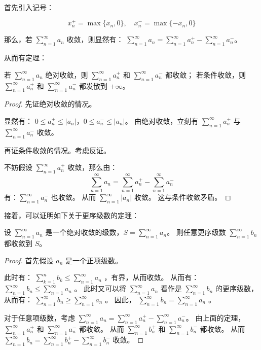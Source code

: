 首先引入记号：

\begin{equation*}
  x_n^+ = \max\{x_n, 0\},\quad x_n^- = \max\{-x_n, 0\}
\end{equation*}

那么，若 $\sum_{n=1}^{\infty} a_n$ 收敛，则显然有： $\sum_{n=1}^{\infty} a_n = \sum_{n=1}^{\infty} a_n^+ - \sum_{n=1}^{\infty} a_n^-$。

从而有定理：

\begin{theorem}
  若 $\sum_{n=1}^{\infty} a_n$ 绝对收敛，则 $\sum_{n=1}^{\infty} a_n^+$ 和 $\sum_{n=1}^{\infty} a_n^-$ 都收敛；
  若条件收敛，则 $\sum_{n=1}^{\infty} a_n^+$ 和 $\sum_{n=1}^{\infty} a_n^-$ 都发散到 $+\infty$。
\end{theorem}

\begin{proof}
  先证绝对收敛的情况。

  显然有： $0 \leq a_n^+ \leq |a_n|$，$0 \leq a_n^- \leq |a_n|$。
  由绝对收敛，立刻有 $\sum_{n=1}^{\infty} a_n^+$ 与 $\sum_{n=1}^{\infty} a_n^-$ 收敛。

  再证条件收敛的情况。考虑反证。

  不妨假设 $\sum_{n=1}^{\infty} a_n^+$ 收敛，那么由：
  $$\sum_{n=1}^{\infty} a_n = \sum_{n=1}^{\infty} a_n^+ - \sum_{n=1}^{\infty} a_n^-$$
  有：$\sum_{n=1}^{\infty} a_n^-$ 也收敛。
  从而 $\sum_{n=1}^{\infty} |a_n|$ 收敛。
  这与条件收敛矛盾。
\end{proof}

接着，可以证明如下关于更序级数的定理：

\begin{theorem}\label{thm:rearrangement-theorem}
  设 $\sum_{n=1}^{\infty} a_n$ 是一个绝对收敛的级数，$S = \sum_{n=1}^{\infty} a_n$。
  则任意更序级数 $\sum_{n=1}^{\infty} b_n$ 都收敛到 $S$。
\end{theorem}

\begin{proof}
  首先假设 $a_n$ 是一个正项级数。

  此时有： $\sum_{k=1}^{n} b_k \leq \sum_{n=1}^{\infty} a_n$ ，有界，从而收敛。
  从而有： $\sum_{n=1}^{\infty} b_n \leq \sum_{n=1}^{\infty} a_n$ 。
  此时又可以将 $\sum_{n=1}^{\infty} a_n$ 看作是 $\sum_{n=1}^{\infty} b_n$ 的更序级数，
  从而有： $\sum_{n=1}^{\infty} b_n \geq \sum_{n=1}^{\infty} a_n$ 。
  因此， $\sum_{n=1}^{\infty} b_n = \sum_{n=1}^{\infty} a_n$ 。

  对于任意项级数，考虑 $\sum_{n=1}^{\infty} a_n = \sum_{n=1}^{\infty} a_n^+ - \sum_{n=1}^{\infty} a_n^-$。
  由上面的定理， $\sum_{n=1}^{\infty} a_n^+$ 和 $\sum_{n=1}^{\infty} a_n^-$ 都收敛。
  从而 $\sum_{n=1}^{\infty} b_n^+$ 和 $\sum_{n=1}^{\infty} b_n^-$ 都收敛。
  从而 $\sum_{n=1}^{\infty} b_n = \sum_{n=1}^{\infty} b_n^+ - \sum_{n=1}^{\infty} b_n^-$ 收敛。
\end{proof}

